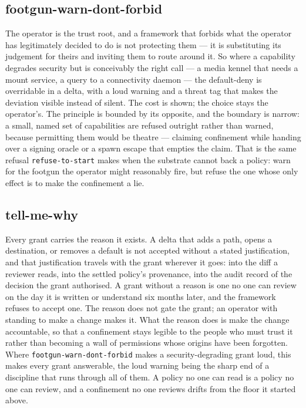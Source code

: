 \hypertarget{footgun-warn-dont-forbid}{%
\subsection{\texorpdfstring{footgun-warn-dont-forbid}{footgun-warn-dont-forbid}}\label{footgun-warn-dont-forbid}}

The operator is the trust root, and a framework that forbids what the
operator has legitimately decided to do is not protecting them --- it is
substituting its judgement for theirs and inviting them to route around
it. So where a capability degrades security but is conceivably the right
call --- a media kennel that needs a mount service, a query to a
connectivity daemon --- the default-deny is overridable in a delta, with
a loud warning and a threat tag that makes the deviation visible instead
of silent. The cost is shown; the choice stays the operator's. The
principle is bounded by its opposite, and the boundary is narrow: a
small, named set of capabilities are refused outright rather than
warned, because permitting them would be theatre --- claiming
confinement while handing over a signing oracle or a spawn escape that
empties the claim. That is the same refusal \texttt{refuse-to-start}
makes when the substrate cannot back a policy: warn for the footgun the
operator might reasonably fire, but refuse the one whose only effect is
to make the confinement a lie.

\hypertarget{tell-me-why}{%
\subsection{\texorpdfstring{tell-me-why}{tell-me-why}}\label{tell-me-why}}

Every grant carries the reason it exists. A delta that adds a path,
opens a destination, or removes a default is not accepted without a
stated justification, and that justification travels with the grant
wherever it goes: into the diff a reviewer reads, into the settled
policy's provenance, into the audit record of the decision the grant
authorised. A grant without a reason is one no one can review on the day
it is written or understand six months later, and the framework refuses
to accept one. The reason does not gate the grant; an operator with
standing to make a change makes it. What the reason does is make the
change accountable, so that a confinement stays legible to the people
who must trust it rather than becoming a wall of permissions whose
origins have been forgotten. Where \texttt{footgun-warn-dont-forbid}
makes a security-degrading grant loud, this makes every grant
answerable, the loud warning being the sharp end of a discipline that
runs through all of them. A policy no one can read is a policy no one
can review, and a confinement no one reviews drifts from the floor it
started above.

